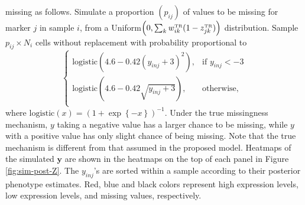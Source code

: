 \documentclass[12pt,]{article}
\newcommand{\p}[1]{\left(#1\right)}
\newcommand{\bc}[1]{ \left\{#1\right\} }
\def\beginmyfig{\begin{figure}[H]\center}
\def\endmyfig{\end{figure}}
\def\y{\bm{y}}
\newcommand{\true}{{\mbox{\tiny TR}}}
\def\beginmyfig{\begin{figure}[H]\center}
\def\endmyfig{\end{figure}}
\begin{document}
missing as follows. Simulate a proportion $(p_{ij})$ of values to be missing
for marker $j$ in sample $i$, from a
Uniform$\p{0, \sum_k w^\true_{ik}(1-z^\true_{jk})}$ distribution. Sample
$p_{ij}\times N_i$ cells without replacement with probability proportional to
$$
\begin{cases}
  \text{logistic}\p{4.6 - 0.42(y_{inj}+3)^2}, & \text{if } y_{inj} < -3 \\
  \text{logistic}\p{4.6 - 0.42\sqrt{y_{inj}+3}}, & \text{otherwise,} \\
\end{cases}
$$
%
where $\text{logistic}(x) = (1 + \exp\bc{-x})^{-1}$.
Under the true missingness mechanism, $y$ taking a negative value has a larger
chance to be missing, while $y$ with a positive value has only slight chance of
being missing.  Note that the true mechanism is different from that assumed in
the proposed model. Heatmaps of the simulated $\y$ are shown in the heatmaps
on the top of each panel in Figure \ref{fig:sim-post-Z}.
The $y_{inj}$'s are sorted within a sample according to their posterior
phenotype estimates. Red, blue and black colors represent high expression
levels, low expression levels, and missing values, respectively.

\end{document}
